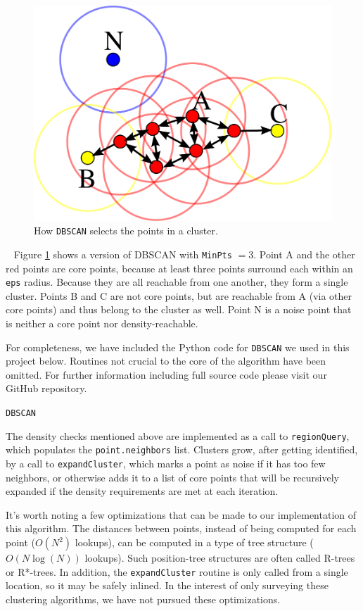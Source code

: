 \documentclass[12pt]{article}
\begin{document}
\begin{figure}[h]
\centering
\includegraphics[width=0.8\linewidth]{DBSCAN-Illustration}
\caption{How \texttt{DBSCAN} selects the points in a cluster.}
\label{fig:DBSCAN}
\end{figure}\
\FloatBarrier
Figure \ref{fig:DBSCAN} \cite{wiki:dbscan} shows a version of DBSCAN with \texttt{MinPts} $= 3$. Point A and the other red points are core points, because at least three points surround each within an \texttt{eps} radius. Because they are all reachable from one another, they form a single cluster. Points B and C are not core points, but are reachable from A (via other core points) and thus belong to the cluster as well. Point N is a noise point that is neither a core point nor density-reachable.
\par For completeness, we have included the Python code for \texttt{DBSCAN} we used in this project below. Routines not crucial to the core of the algorithm have been omitted. For further information including full source code please visit our GitHub repository.\cite{git}

\begin{center}
\texttt{DBSCAN}
\end{center}
\singlespacing

\doublespacing
\par The density checks mentioned above are implemented as a call to \texttt{regionQuery}, which populates the \texttt{point.neighbors} list. Clusters grow, after getting identified, by a call to \texttt{expandCluster}, which marks a point as noise if it has too few neighbors, or otherwise adds it to a list of core points that will be recursively expanded if the density requirements are met at each iteration.
\par It's worth noting a few optimizations that can be made to our implementation of this algorithm.
The distances between points, instead of being computed for each point ($O(N^2)$ lookups), can be computed in a type of tree structure ($O(N \log(N))$ lookups). Such position-tree structures are often called R-trees or R*-trees.
In addition, the \texttt{expandCluster} routine is only called from a single location, so it may be safely inlined. In the interest of only surveying these clustering algorithms, we have not pursued these optimizations.
\end{document}
